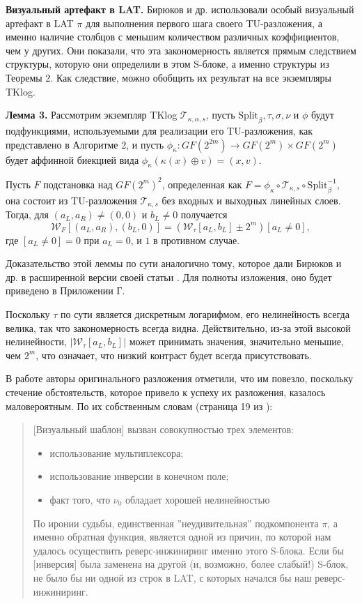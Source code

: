 \textbf{Визуальный артефакт в LAT.} Бирюков и др. использовали особый визуальный артефакт в LAT \(\pi\) для выполнения первого шага своего TU-разложения, а именно наличие столбцов с меньшим количеством различных коэффициентов, чем у других. Они показали, что эта закономерность является прямым следствием структуры, которую они определили в этом S-блоке, а именно структуры из Теоремы 2. Как следствие, можно обобщить их результат на все экземпляры TKlog.

\textbf{Лемма 3.}
Рассмотрим экземпляр TKlog \(\mathscr{T}_{\kappa,\alpha,s}\), пусть \(\text{Split}_{\beta}, \tau, \sigma, \nu\) и \(\phi\) будут подфункциями, используемыми для реализации его TU-разложения, как представлено в Алгоритме 2, и пусть \(\phi_{\kappa} : GF(2^{2m}) \to GF(2^m) \times GF(2^m)\) будет аффинной биекцией вида \(\phi_{\kappa}(\kappa(x) \oplus v) = (x, v)\).

Пусть \(F\) подстановка над \(GF (2^m)^2\), определенная как \(F = \phi_{\kappa} \circ \mathscr{T}_{\kappa,s} \circ \text{Split}^{-1}_{\beta}\), она состоит из TU-разложения \(\mathscr{T}_{\kappa,s}\) без входных и выходных линейных слоев. Тогда, для \((a_L, a_R) \neq (0, 0)\) и \(b_L \neq 0\) получается
\[
\mathcal{W}_{F}[(a_L, a_R), (b_L, 0)] = \left(\mathcal{W}_{\tau}[a_L, b_L] \pm 2^m\right)[a_L \neq 0],
\]
где \([a_L \neq 0] = 0\) при \(a_L = 0\), и \(1\) в противном случае.

Доказательство этой леммы по сути аналогично тому, которое дали Бирюков и др. в расширенной версии своей статьи \cite{BPU16b}. Для полноты изложения, оно будет приведено в Приложении Г. 

Поскольку \(\tau\) по сути является дискретным логарифмом, его нелинейность всегда велика, так что закономерность всегда видна. Действительно, из-за этой высокой нелинейности, \(|\mathcal{W}_{\tau}[a_L, b_L]|\) может принимать значения, значительно меньшие, чем \(2^m\), что означает, что низкий контраст будет всегда присутствовать.

В работе \cite{BPU16a} авторы оригинального разложения отметили, что им повезло, поскольку стечение обстоятельств, которое привело к успеху их разложения, казалось маловероятным. По их собственным словам (страница 19 из \cite{BPU16b}):
\begin{quote}
[Визуальный шаблон] вызван совокупностью трех элементов:
\begin{itemize}
\item использование мультиплексора;
\item использование инверсии в конечном поле;
\item факт того, что \(\nu_0\) обладает хорошей нелинейностью
\end{itemize}
По иронии судьбы, единственная ''неудивительная'' подкомпонента \(\pi\), а именно обратная функция, является одной из причин, по которой нам удалось осуществить реверс-инжиниринг именно этого S-блока. Если бы [инверсия] была заменена на другой (и, возможно, более слабый!) S-блок, не было бы ни одной из строк в LAT, с которых начался бы наш реверс-инжиниринг.
\end{quote}

